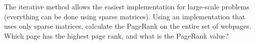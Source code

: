\begin{problem}
The iterative method allows the easiest implementation for large-scale problems (everything can be done using sparse matrices). Using an implementation that uses only sparse matrices, calculate the PageRank on the entire set of webpages. Which page has the highest page rank, and what is the PageRank value?
\end{problem}

